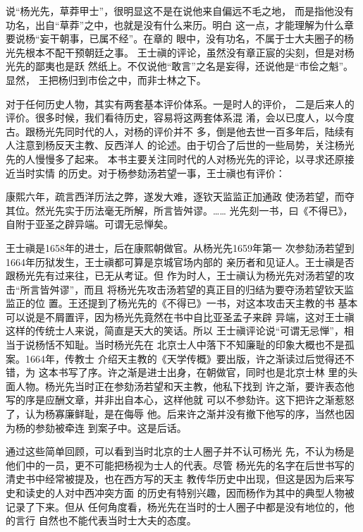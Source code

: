 说“杨光先，草莽甲士”，很明显这不是在说他来自偏远不毛之地，%
而是指他没有功名，出自“草莽”之中，也就是没有什么来历。明白%
这一点，才能理解为什么章要说杨“妄干朝事，已属不经”。在章的%
眼中，没有功名，不属于士大夫圈子的杨光先根本不配干预朝廷之事。%
王士禛的评论，虽然没有章正宸的尖刻，但是对杨光先的鄙夷也是跃%
然纸上。不仅说他“敢言”之名是妄得，还说他是“市侩之魁”。显然，%
王把杨归到市侩之中，而非士林之下。%
\par
对于任何历史人物，其实有两套基本评价体系。一是时人的评价，%
二是后来人的评价。很多时候，我们看待历史，容易将这两套体系混%
淆，会以已度人，以今度古。跟杨光先同时代的人，对杨的评价并不%
多，倒是他去世一百多年后，陆续有人注意到杨反天主教、反西洋人%
的论述。由于切合了后世的一些局势，关注杨光先的人慢慢多了起来。%
本书主要关注同时代的人对杨光先的评论，以寻求还原接近当时实情%
的历史。对于杨参劾汤若望一事，王士禛也有评价：%
\par
{\bookkai 康熙六年，疏言西洋历法之弊，遂发大难，逐钦天监监正加通政}%
{\bookkai 使汤若望，而夺其位。然光先实于历法毫无所解，所言皆舛谬。……}%
{\bookkai 光先刻一书，曰《不得已》，自附于亚圣之辟异端。可谓无忌惮矣。}%
\par
王士禛是1658年的进士，后在康熙朝做官。从杨光先1659年第一%
次参劾汤若望到1664年历狱发生，王士禛都可算是京城官场内部的%
亲历者和见证人。王士禛是否跟杨光先有过来往，已无从考证。但%
作为时人，王士禛认为杨光先对汤若望的攻击“所言皆舛谬”，而且%
将杨光先攻击汤若望的真正目的归结为要夺汤若望钦天监监正的位%
置。王还提到了杨光先的《不得已》一书，对这本攻击天主教的书%
基本可以说是不屑置评，因为杨光先竟然在书中自比亚圣孟子来辟%
异端，这对王士禛这样的传统士人来说，简直是天大的笑话。所以%
王士禛评论说“可谓无忌惮”，相当于说杨恬不知耻。当时杨光先在%
北京士人中落下不知廉耻的印象大概也不是孤案。1664年，传教士%
介绍天主教的《天学传概》要出版，许之渐读过后觉得还不错，为%
这本书写了序。许之渐是进士出身，在朝做官，同时也是北京士林%
里的头面人物。杨光先当时正在参劾汤若望和天主教，他私下找到%
许之渐，要许表态他写的序是应酬文章，并非出自本心，这样他就%
可以不参劾许。这下把许之渐惹怒了，认为杨寡廉鲜耻，是在侮辱%
他。后来许之渐并没有撤下他写的序，当然也因为杨的参劾被牵连%
到案子中。这是后话。%
\par
通过这些简单回顾，可以看到当时北京的士人圈子并不认可杨光%
先，不认为杨是他们中的一员，更不可能把杨视为士人的代表。尽管%
杨光先的名字在后世书写的清史书中经常被提及，也在西方写的天主%
教传华历史中出现，但这是因为后来写史和读史的人对中西冲突方面%
的历史有特别兴趣，因而杨作为其中的典型人物被记录了下来。但从%
任何角度看，杨光先在当时的士人圈子中都是没有地位的，他的言行%
自然也不能代表当时士大夫的态度。%
